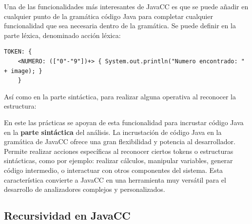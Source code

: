 Una de las funcionalidades más interesantes de JavaCC es que se puede añadir en cualquier punto de la gramática código Java para completar cualquier funcionalidad que sea necesaria dentro de la gramática. Se puede definir en la parte léxica, denominado acción léxica:

\lstset{inputencoding=utf8/latin1}
\begin{lstlisting}
TOKEN: {
	<NUMERO: (["0"-"9"])+> { System.out.println("Numero encontrado: " + image); }
	}
\end{lstlisting}

Así como en la parte sintáctica, para realizar alguna operativa al reconocer la estructura:

\lstset{inputencoding=utf8/latin1}


En este \pfg las prácticas se apoyan de esta funcionalidad para incrustar código Java en la \textbf{parte sintáctica} del análisis.
La incrustación de código Java en la gramática de JavaCC ofrece una gran flexibilidad y potencia al desarrollador. Permite realizar acciones específicas al reconocer ciertos tokens o estructuras sintácticas, como por ejemplo: realizar cálculos, manipular variables, generar código intermedio, o interactuar con otros componentes del sistema. Esta característica convierte a JavaCC en una herramienta muy versátil para el desarrollo de analizadores complejos y personalizados.

\subsection{Recursividad en JavaCC}




